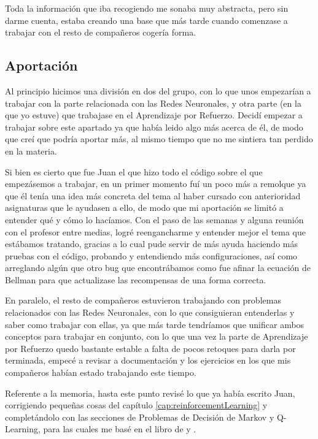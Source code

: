Toda la información que iba recogiendo me sonaba muy abstracta, pero sin darme cuenta, estaba creando una base que más tarde cuando comenzase a trabajar con el resto de compañeros cogería forma.

\subsection{Aportación}

Al principio hicimos una división en dos del grupo, con lo que unos empezarían a trabajar con la parte relacionada con las Redes Neuronales, y otra parte (en la que yo estuve) que trabajase en el Aprendizaje por Refuerzo. Decidí empezar a trabajar sobre este apartado ya que había leido algo más acerca de él, de modo que creí que podría aportar más, al mismo tiempo que no me sintiera tan perdido en la materia. 

Si bien es cierto que fue Juan el que hizo todo el código sobre el que empezásemos a trabajar, en un primer momento fuí un poco más a remolque ya que él tenía una idea más concreta del tema al haber cursado con anterioridad asignaturas que le ayudasen a ello, de modo que mi aportación se limitó a entender qué y cómo lo hacíamos. Con el paso de las semanas y alguna reunión con el profesor entre medias, logré reengancharme y entender mejor el tema que estábamos tratando, gracias a lo cual pude servir de más ayuda haciendo más pruebas con el código, probando y entendiendo más configuraciones, así como arreglando algún que otro bug que encontrábamos como fue afinar la ecuación de Bellman para que actualizase las recompensas de una forma correcta.

En paralelo, el resto de compañeros estuvieron trabajando con problemas relacionados con las Redes Neuronales, con lo que consiguieran entenderlas y saber como trabajar con ellas, ya que más tarde tendríamos que unificar ambos conceptos para trabajar en conjunto, con lo que una vez la parte de Aprendizaje por Refuerzo quedo bastante estable a falta de pocos retoques para darla por terminada, empecé a revisar a documentación y los ejercicios en los que mis compañeros habían estado trabajando este tiempo.

Referente a la memoria, hasta este punto revisé lo que ya había escrito Juan, corrigiendo pequeñas cosas del capítulo \ref{cap:reinforcementLearning} y completándolo con las secciones de Problemas de Decisión de Markov y Q-Learning, para las cuales me basé en el libro de \citet[cap. 9]{Buduma:general} y \citet{Watkins1992}.

